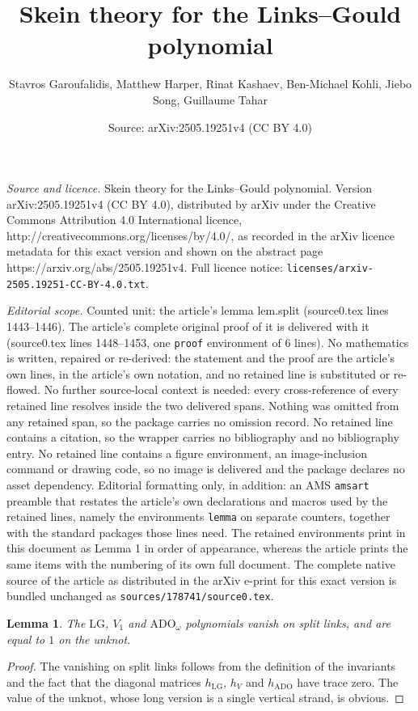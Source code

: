 \documentclass[10pt,a4paper]{amsart}
\title{Skein theory for the Links--Gould polynomial}
\author{Stavros Garoufalidis, Matthew Harper, Rinat Kashaev, Ben-Michael Kohli, Jiebo Song, Guillaume Tahar}
\date{Source: arXiv:2505.19251v4 (CC BY 4.0)}
\newtheorem{lemma}{Lemma}
\def\ADO{\mathrm{ADO}}
\def\LG{\mathrm{LG}}
\begin{document}
\maketitle

\noindent\emph{Source and licence.} Skein theory for the Links--Gould polynomial. Version arXiv:2505.19251v4 (CC BY 4.0), distributed by arXiv under the Creative Commons Attribution 4.0 International licence, http://creativecommons.org/licenses/by/4.0/, as recorded in the arXiv licence metadata for this exact version and shown on the abstract page https://arxiv.org/abs/2505.19251v4. Full licence notice: \texttt{licenses/arxiv-2505.19251-CC-BY-4.0.txt}.\par\smallskip

\noindent\textit{Editorial scope.} Counted unit: the article's lemma lem.split (source0.tex lines 1443--1446). The article's complete original proof of it is delivered with it (source0.tex lines 1448--1453, one \texttt{proof} environment of 6 lines). No mathematics is written, repaired or re-derived: the statement and the proof are the article's own lines, in the article's own notation, and no retained line is substituted or re-flowed.  No further source-local context is needed: every cross-reference of every retained line resolves inside the two delivered spans.  Nothing was omitted from any retained span, so the package carries no omission record.  No retained line contains a citation, so the wrapper carries no bibliography and no bibliography entry.  No retained line contains a figure environment, an image-inclusion command or drawing code, so no image is delivered and the package declares no asset dependency.  Editorial formatting only, in addition: an AMS \texttt{amsart} preamble that restates the article's own declarations and macros used by the retained lines, namely the environments \texttt{lemma} on separate counters, together with the standard packages those lines need.  The retained environments print in this document as Lemma 1 in order of appearance, whereas the article prints the same items with the numbering of its own full document.  The complete native source of the article as distributed in the arXiv e-print for this exact version is bundled unchanged as \texttt{sources/178741/source0.tex}.
\begin{lemma}
\label{lem.split}
The $\LG$, $V_1$ and $\ADO_\omega$ polynomials vanish on split links, and are equal to $1$ on the unknot.
\end{lemma} 

\begin{proof}
The vanishing on split links follows from the definition of the invariants
and the fact that the diagonal matrices $h_{\LG}$, $h_{V}$ and $h_{\ADO}$
have trace zero. The value of the unknot, whose long version is a single
vertical strand, is obvious. 
\end{proof}
\end{document}
